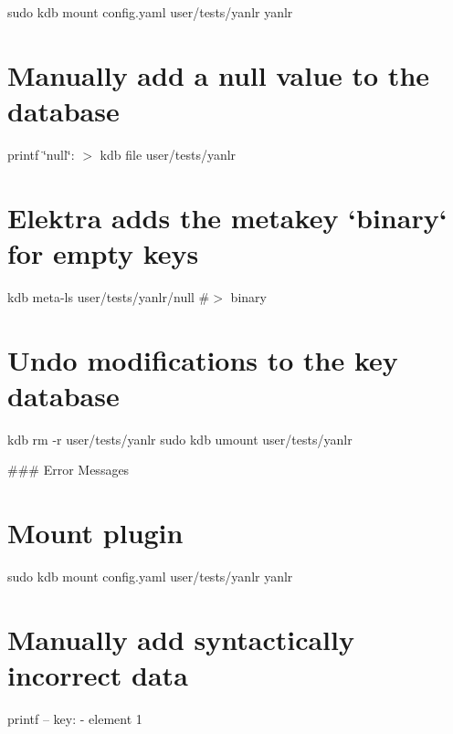 sudo kdb mount config.\+yaml user/tests/yanlr yanlr\hypertarget{autotoc_md955_autotoc_md978}{}\section{Manually add a null value to the database}\label{autotoc_md955_autotoc_md978}
printf \textquotesingle{}\char`\"{}null\char`\"{}\+:\textquotesingle{} $>$ {\ttfamily kdb file user/tests/yanlr}\hypertarget{autotoc_md955_autotoc_md979}{}\section{Elektra adds the metakey `binary` for empty keys}\label{autotoc_md955_autotoc_md979}
kdb meta-\/ls user/tests/yanlr/null \#$>$ binary\hypertarget{autotoc_md955_autotoc_md980}{}\section{Undo modifications to the key database}\label{autotoc_md955_autotoc_md980}
kdb rm -\/r user/tests/yanlr sudo kdb umount user/tests/yanlr 
\begin{DoxyCode}
### Error Messages
\end{DoxyCode}
 \hypertarget{autotoc_md955_autotoc_md981}{}\section{Mount plugin}\label{autotoc_md955_autotoc_md981}
sudo kdb mount config.\+yaml user/tests/yanlr yanlr\hypertarget{autotoc_md955_autotoc_md982}{}\section{Manually add syntactically incorrect data}\label{autotoc_md955_autotoc_md982}
printf -- \textquotesingle{}key\+: -\/ element 1~\newline
